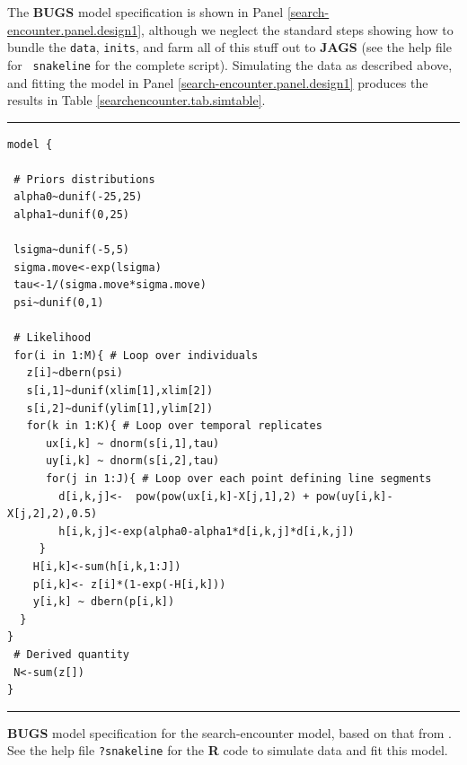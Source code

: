 The {\bf BUGS} model specification is shown in Panel
\ref{search-encounter.panel.design1}, although we neglect the standard
steps showing how to
bundle the \mbox{\tt data}, \mbox{\tt inits}, and farm
all of this stuff out to {\bf JAGS} (see the help file for \mbox{\tt
  snakeline} for the complete script).
Simulating the data as described above, and fitting the model in Panel
\ref{search-encounter.panel.design1} produces the results in Table
\ref{searchencounter.tab.simtable}.

\begin{panel}[htp]
\centering
\rule[0.15in]{\textwidth}{.03in}
{\small
\begin{verbatim}
model {

 # Priors distributions
 alpha0~dunif(-25,25)
 alpha1~dunif(0,25)

 lsigma~dunif(-5,5)
 sigma.move<-exp(lsigma)
 tau<-1/(sigma.move*sigma.move)
 psi~dunif(0,1)

 # Likelihood
 for(i in 1:M){ # Loop over individuals
   z[i]~dbern(psi)
   s[i,1]~dunif(xlim[1],xlim[2])
   s[i,2]~dunif(ylim[1],ylim[2])
   for(k in 1:K){ # Loop over temporal replicates
      ux[i,k] ~ dnorm(s[i,1],tau)
      uy[i,k] ~ dnorm(s[i,2],tau)
      for(j in 1:J){ # Loop over each point defining line segments
        d[i,k,j]<-  pow(pow(ux[i,k]-X[j,1],2) + pow(uy[i,k]-X[j,2],2),0.5)
        h[i,k,j]<-exp(alpha0-alpha1*d[i,k,j]*d[i,k,j])
     }
    H[i,k]<-sum(h[i,k,1:J])
    p[i,k]<- z[i]*(1-exp(-H[i,k]))
    y[i,k] ~ dbern(p[i,k])
  }
}
 # Derived quantity
 N<-sum(z[])
}
\end{verbatim}
}
\rule[-0.15in]{\textwidth}{.03in}
\caption{
{\bf BUGS} model specification for the search-encounter model, based
on that from \citet{royle_etal:2011mee}.
See the
help file \mbox{\tt ?snakeline} for the {\bf R} code to simulate data
and fit this model.
}
\label{search-encounter.panel.design1}
\end{panel}




